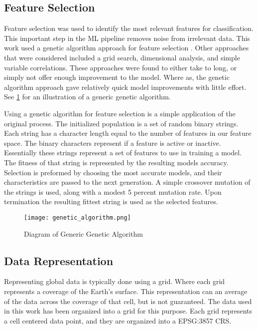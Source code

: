 \subsection{Feature Selection}
Feature selection was used to identify the most relevant features for classification.
This important step in the \ac{ML} pipeline removes noise from irrelevant data.
This work used a genetic algorithm approach for feature selection \cite{yang1998feature}.
Other approaches that were considered included a grid search, dimensional analysis, and simple variable correlations.
These approaches were found to either take to long, or simply not offer enough improvement to the model.
Where as, the genetic algorithm approach gave relatively quick model improvements with little effort.
See \ref{fig:GA} for an illustration of a generic genetic algorithm.

\par
Using a genetic algorithm for feature selection is a simple application of the original process.
The initialized population is a set of random binary strings.
Each string has a character length equal to the number of features in our feature space.
The binary characters represent if a feature is active or inactive.
Essentially these strings represent a set of features to use in training a model.
The fitness of that string is represented by the resulting models accuracy.
Selection is preformed by choosing the most accurate models, and their characteristics are passed to the next generation.
A simple crossover mutation of the strings is used, along with a modest 5 percent mutation rate.
Upon termination the resulting fittest string is used as the selected features.


\begin{center}
    \begin{figure}[h]
        \caption{Diagram of Generic Genetic Algorithm}
        \label{fig:GA}
        \texttt{[image: genetic\_algorithm.png]}
    \end{figure}
\end{center}

\subsection{Data Representation}
Representing global data is typically done using a grid.
Where each grid represents a coverage of the Earth's surface.
This representation can an average of the data across the coverage of that cell, but is not guaranteed.
The data used in this work has been organized into a grid for this purpose.
Each grid represents a cell centered data point, and they are organized into a EPSG:3857 \ac{CRS}.

